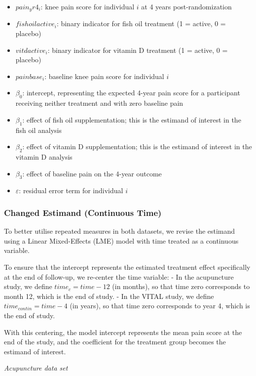 \documentclass{article}
\providecommand{\tightlist}{%
  \setlength{\itemsep}{0pt}\setlength{\parskip}{0pt}}
\begin{document}
\begin{itemize}
\tightlist
\item
  \(pain_yr4_i\): knee pain score for individual \(i\) at 4 years
  post-randomization
\item
  \(fishoilactive_i\): binary indicator for fish oil treatment (1 =
  active, 0 = placebo)
\item
  \(vitdactive_i\): binary indicator for vitamin D treatment (1 =
  active, 0 = placebo)
\item
  \(painbase_i\): baseline knee pain score for individual \(i\)
\item
  \(\beta_0\): intercept, representing the expected 4-year pain score
  for a participant receiving neither treatment and with zero baseline
  pain
\item
  \(\beta_1\): effect of fish oil supplementation; this is the estimand
  of interest in the fish oil analysis
\item
  \(\beta_2\): effect of vitamin D supplementation; this is the estimand
  of interest in the vitamin D analysis
\item
  \(\beta_3\): effect of baseline pain on the 4-year outcome
\item
  \(\varepsilon\): residual error term for individual \(i\)
\end{itemize}

\subsubsection{Changed Estimand (Continuous
Time)}\label{changed-estimand-continuous-time}

To better utilise repeated measures in both datasets, we revise the
estimand using a Linear Mixed-Effects (LME) model with time treated as a
continuous variable.

To ensure that the intercept represents the estimated treatment effect
specifically at the end of follow-up, we re-center the time variable: -
In the acupuncture study, we define \(time_c = time - 12\) (in months),
so that time zero corresponds to month 12, which is the end of study. -
In the VITAL study, we define \(time_{contin} = time - 4\) (in years),
so that time zero corresponds to year 4, which is the end of study.

With this centering, the model intercept represents the mean pain score
at the end of the study, and the coefficient for the treatment group
becomes the estimand of interest.

\emph{Acupuncture data set}
\end{document}
